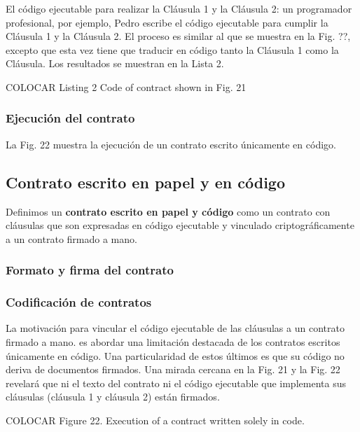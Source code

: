 \documentclass[12pt]{report} %
\begin{document}
\begin{itemize}
El código ejecutable para realizar la Cláusula 1 y la Cláusula 2: un programador profesional, por ejemplo, Pedro escribe el código ejecutable para cumplir la Cláusula 1 y la Cláusula 2. El proceso es similar al que se muestra en la Fig. ??, excepto que esta vez tiene que traducir en código tanto la Cláusula 1 como la Cláusula. Los resultados se muestran en la Lista 2.

COLOCAR Listing 2 Code of contract shown in Fig. 21

\subsubsection{Ejecución del contrato}

La Fig. 22 muestra la ejecución de un contrato escrito únicamente en código.

\subsection{Contrato escrito en papel y en código}

Definimos un \textbf{contrato escrito en papel y código} como un contrato con cláusulas que son expresadas en código ejecutable y vinculado criptográficamente a un contrato firmado a mano.

\subsubsection{Formato y firma del contrato}

\subsubsection{Codificación de contratos}

La motivación para vincular el código ejecutable de las cláusulas a un contrato firmado a mano. es abordar una limitación destacada de los contratos escritos únicamente en código. Una particularidad de estos últimos es que su código no  deriva de documentos firmados. Una mirada cercana en la Fig. 21 y la Fig. 22 revelará que ni el texto del contrato ni el código ejecutable  que implementa sus cláusulas (cláusula 1 y cláusula 2) están firmados.

COLOCAR Figure 22. Execution of a contract written solely in code.


\end{itemize}
\end{document}

